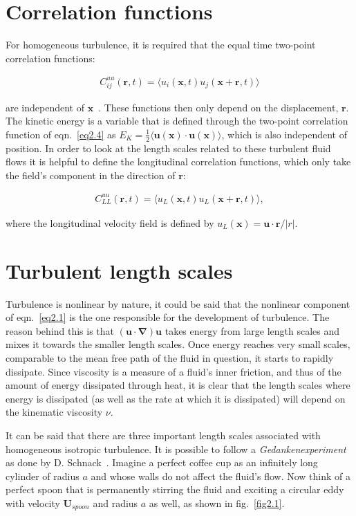 \documentclass[12pt,a4paper]{report}
\begin{document}
\section{Correlation functions}

For homogeneous turbulence, it is required that the equal time two-point correlation functions:

\begin{align}
 C_{ij}^{uu}(\bm r, t) = \langle u_i(\bm x, t) u_j(\bm x + \bm r, t) \rangle
 \label{eq2.4}
\end{align}

are independent of $\bm x$~\cite{biskamp1997nonlinear}. These functions then only depend on the displacement, $\bm r$. The kinetic energy is a variable that is defined through the two-point correlation function of eqn.~\ref{eq2.4} as $E_K = \frac{1}{2} \langle \bm u (\bm x) \cdot \bm u (\bm x) \rangle$, which is also independent of position. In order to look at the length scales related to these turbulent fluid flows it is helpful to define the longitudinal correlation functions, which only take the field's component in the direction of $\bm r$: 

\begin{align}
 C_{LL}^{uu}(\bm r, t) = \langle u_L(\bm x, t)u_L(\bm x + \bm r, t) \rangle,
 \label{eq2.5}
\end{align}

where the longitudinal velocity field is defined by $u_L(\bm x)=\bm u \cdot \bm r / \vert r \vert$. 

\section{Turbulent length scales}
\label{sec2.4}

Turbulence is nonlinear by nature, it could be said that the nonlinear component of eqn.~\ref{eq2.1} is the one responsible for the development of turbulence. The reason behind this is that $(\bm u \cdot \bm \nabla) \bm u$ takes energy from large length scales and mixes it towards the smaller length scales. Once energy reaches very small scales, comparable to the mean free path of the fluid in question, it starts to rapidly dissipate. Since viscosity is a measure of a fluid's inner friction, and thus of the amount of energy dissipated through heat, it is clear that the length scales where energy is dissipated (as well as the rate at which it is dissipated) will depend on the kinematic viscosity $\nu$. 

It can be said that there are three important length scales associated with homogeneous isotropic turbulence. It is possible to follow a \textit{Gedankenexperiment} as done by D. Schnack~\cite{schnack2009lectures}. Imagine a perfect coffee cup as an infinitely long cylinder of radius $a$ and whose walls do not affect the fluid's flow. Now think of a perfect spoon that is permanently stirring the fluid and exciting a circular eddy with velocity $\bm U_{spoon}$ and radius $a$ as well, as shown in fig.~\ref{fig2.1}.
\end{document}
